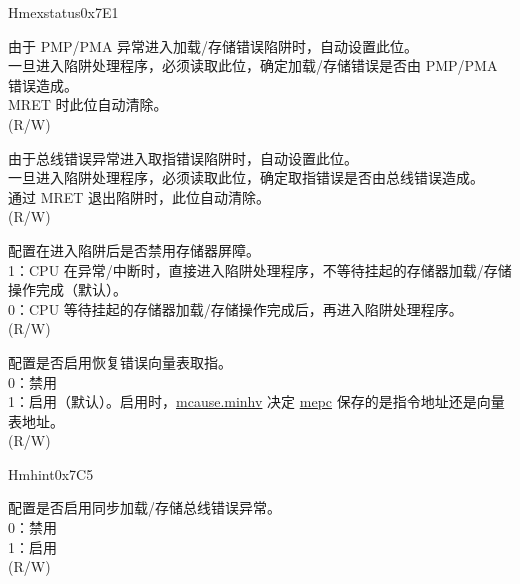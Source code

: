 \begin{register}{H}{mexstatus}{0x7E1}
\begin{regdesc}\begin{reglist}
\item [接上页……]
\label{fielddesc:MEXSTATUS_PMP_ERR}\item [PMP\_ERR] 由于 PMP/PMA 异常进入加载/存储错误陷阱时，自动设置此位。\\
一旦进入陷阱处理程序，必须读取此位，确定加载/存储错误是否由 PMP/PMA 错误造成。\\
MRET 时此位自动清除。\\
(R/W)
\label{fielddesc:MEXSTATUS_FETCH_ERR}\item [FETCH\_ERR] 由于总线错误异常进入取指错误陷阱时，自动设置此位。\\
一旦进入陷阱处理程序，必须读取此位，确定取指错误是否由总线错误造成。\\
通过 MRET 退出陷阱时，此位自动清除。\\
(R/W)
\label{fielddesc:MEXSTATUS_NMFT}\item [NMFT] 配置在进入陷阱后是否禁用存储器屏障。\\
1：CPU 在异常/中断时，直接进入陷阱处理程序，不等待挂起的存储器加载/存储操作完成（默认）。 \\
0：CPU 等待挂起的存储器加载/存储操作完成后，再进入陷阱处理程序。\\
(R/W)
\label{fielddesc:MEXSTATUS_CLIC_INHV}\item [CLIC\_INHV] 配置是否启用恢复错误向量表取指。\\
0：禁用\\
1：启用（默认）。启用时，\hyperref[fielddesc:MCAUSE_MINHV]{mcause.minhv} 决定 \hyperref[regdesc:MEPC]{mepc} 保存的是指令地址还是向量表地址。\\
(R/W)
\end{reglist}\end{regdesc}
\end{register}

\begin{register}{H}{mhint}{0x7C5}\label{regdesc:MHINT}%
%
%
%
\regnewline%
\begin{regdesc}\begin{reglist}
\label{fielddesc:MHINT_SBE}\item [SBE] 配置是否启用同步加载/存储总线错误异常。\\
0：禁用\\
1：启用\\
(R/W)
\end{reglist}\end{regdesc}
\end{register}

